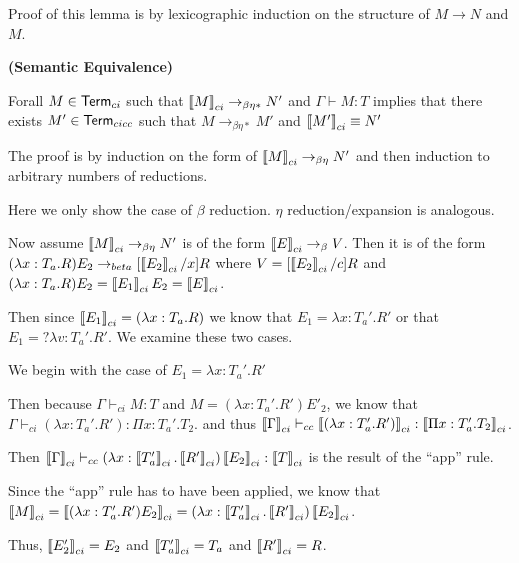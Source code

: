 Proof of this lemma is by lexicographic induction on the structure of $M \rightarrow N$ and $M$.

\begin{theorem}
\textbf{(Semantic Equivalence)}

Forall $M \in \mathsf{Term}_{ci}$ such that $\left\llbracket M \right\rrbracket_{ci} \rightarrow_{\beta\eta*} N'$ and 
$\Gamma \vdash M : T$ implies that there exists $M' \in \mathsf{Term}_{cicc}$ such that 
$M \rightarrow_{\beta\eta*} M'$ and $\left\llbracket M' \right\rrbracket_{ci} \equiv N'$

\label{cicc:equiv}
\end{theorem}

The proof is by induction on the form of $\left\llbracket M \right\rrbracket_{ci} \rightarrow_{\beta\eta} N'$
and then induction to arbitrary numbers of reductions.  

Here we only show the case of $\beta$ reduction.  $\eta$ reduction/expansion is analogous.

Now assume $\left\llbracket M \right\rrbracket_{ci} \rightarrow_{\beta\eta} N'$ is of the form 
$\left\llbracket E \right\rrbracket_{ci} \rightarrow_{\beta} V$.  
Then it is of the form $(\lambda x : T_a . R) E_2 \rightarrow_{beta} [ \left\llbracket E_2 \right\rrbracket_{ci}/ x ] R $
where $V = [ \left\llbracket E_2 \right\rrbracket_{ci} / c ] R$ and $(\lambda x : T_a . R) E_2 = \left\llbracket E_1 \right\rrbracket_{ci} E_2 = \left\llbracket E \right\rrbracket_{ci}$.

Then since $\left\llbracket E_1 \right\rrbracket_{ci} = (\lambda x : T_a . R)$ we know that $E_1 = \lambda x : T_a' . R'$ 
or that $E_1 = ?\lambda v : T_a' . R'$.  We examine these two cases.

\setcounter{tcases}{0}

\begin{tcases}
We begin with the case of $E_1 = \lambda x : T_a' . R'$
\end{tcases}

Then because $\Gamma \vdash_{ci} M : T$ and $M = (\lambda x : T_a' . R') E'_2$, 
we know that $\Gamma \vdash_{ci} (\lambda x : T_a' . R') : \Pi x : T_a' . T_2$.
and thus 
$\left\llbracket \Gamma \right\rrbracket_{ci} \vdash_{cc} 
\left\llbracket (\lambda x : T_a' . R') \right\rrbracket_{ci} : \left\llbracket \Pi x : T_a' . T_2 \right\rrbracket_{ci}$.

Then $\left\llbracket \Gamma \right\rrbracket_{ci} \vdash_{cc} (\lambda x : \left\llbracket T_a' \right\rrbracket_{ci} . \left\llbracket R' \right\rrbracket_{ci}) \left\llbracket E_2 \right\rrbracket_{ci} : \left\llbracket T \right\rrbracket_{ci}$ is the result of the ``app'' rule.  

Since the ``app'' rule has to have been applied, we know that 
$\left\llbracket M \right\rrbracket_{ci} = 
\left\llbracket (\lambda x : T_a' . R') E_2 \right\rrbracket_{ci} 
= (\lambda x : \left\llbracket T_a' \right\rrbracket_{ci} . \left\llbracket R' \right\rrbracket_{ci}) \left\llbracket E_2 \right\rrbracket_{ci}$.

Thus, $\left\llbracket E_2' \right\rrbracket_{ci} = E_2$ and $\left\llbracket T_a' \right\rrbracket_{ci} = T_a$ and $\left\llbracket R' \right\rrbracket_{ci} = R$. 


